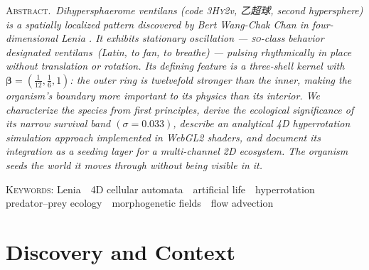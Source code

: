 \documentclass[11pt,a4paper]{article}
\newcommand{\spc}[1]{\textit{#1}}  %
\newcommand{\ventilans}{\textit{ventilans}}
\newcommand{\SO}{\textsc{so}}
\begin{document}
\begin{center}
\begin{minipage}{0.82\linewidth}
  \small\color{muted}
  \textsc{Abstract.}\,\itshape
  \spc{Dihypersphaerome ventilans} (code 3\textsc{Hy}2v, 乙超球,
  \textit{second hypersphere}) is a spatially localized pattern discovered by
  Bert Wang-Chak Chan in four-dimensional Lenia \citep{chan2020}. It exhibits
  stationary oscillation --- \SO-class behavior designated \ventilans\
  (Latin, \textit{to fan, to breathe}) --- pulsing rhythmically in place
  without translation or rotation. Its defining feature is a three-shell
  kernel with $\boldsymbol{\beta} = (\tfrac{1}{12},\tfrac{1}{6},1)$: the
  outer ring is twelvefold stronger than the inner, making the organism's
  \textit{boundary} more important to its physics than its interior. We
  characterize the species from first principles, derive the ecological
  significance of its narrow survival band $(\sigma=0.033)$, describe an
  analytical 4D hyperrotation simulation approach implemented in WebGL2
  shaders, and document its integration as a seeding layer for a
  multi-channel 2D ecosystem. The organism seeds the world it moves through
  without being visible in it.
\end{minipage}
\end{center}

\vspace{10pt}
\begin{center}
  {\sffamily\footnotesize\color{muted}
  \textsc{Keywords}: Lenia \,\textperiodcentered\, 4D cellular automata \,\textperiodcentered\, artificial life \,\textperiodcentered\,
  hyperrotation \,\textperiodcentered\, predator--prey ecology \,\textperiodcentered\, morphogenetic fields \,\textperiodcentered\, flow advection}
\end{center}

\newpage

\section{Discovery and Context}
\end{document}
